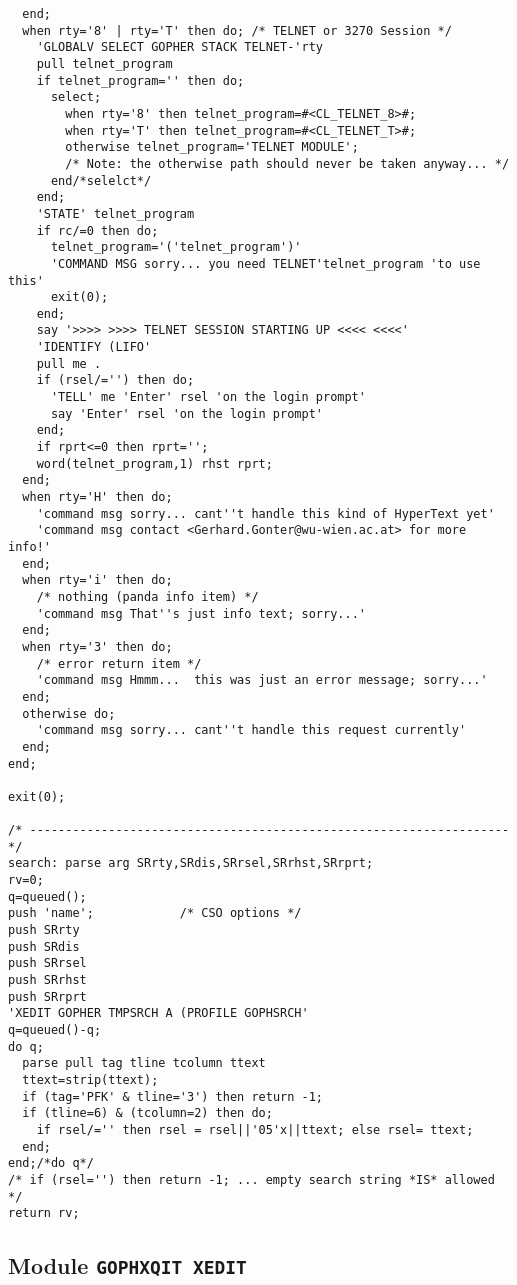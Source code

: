 \begin{verbatim}
  end;
  when rty='8' | rty='T' then do; /* TELNET or 3270 Session */
    'GLOBALV SELECT GOPHER STACK TELNET-'rty
    pull telnet_program
    if telnet_program='' then do;
      select;
        when rty='8' then telnet_program=#<CL_TELNET_8>#;
        when rty='T' then telnet_program=#<CL_TELNET_T>#;
        otherwise telnet_program='TELNET MODULE';
        /* Note: the otherwise path should never be taken anyway... */
      end/*selelct*/
    end;
    'STATE' telnet_program
    if rc/=0 then do;
      telnet_program='('telnet_program')'
      'COMMAND MSG sorry... you need TELNET'telnet_program 'to use this'
      exit(0);
    end;
    say '>>>> >>>> TELNET SESSION STARTING UP <<<< <<<<'
    'IDENTIFY (LIFO'
    pull me .
    if (rsel/='') then do;
      'TELL' me 'Enter' rsel 'on the login prompt'
      say 'Enter' rsel 'on the login prompt'
    end;
    if rprt<=0 then rprt='';
    word(telnet_program,1) rhst rprt;
  end;
  when rty='H' then do;
    'command msg sorry... cant''t handle this kind of HyperText yet'
    'command msg contact <Gerhard.Gonter@wu-wien.ac.at> for more info!'
  end;
  when rty='i' then do;
    /* nothing (panda info item) */
    'command msg That''s just info text; sorry...'
  end;
  when rty='3' then do;
    /* error return item */
    'command msg Hmmm...  this was just an error message; sorry...'
  end;
  otherwise do;
    'command msg sorry... cant''t handle this request currently'
  end;
end;

exit(0);

/* ------------------------------------------------------------------- */
search: parse arg SRrty,SRdis,SRrsel,SRrhst,SRrprt;
rv=0;
q=queued();
push 'name';            /* CSO options */
push SRrty
push SRdis
push SRrsel
push SRrhst
push SRrprt
'XEDIT GOPHER TMPSRCH A (PROFILE GOPHSRCH'
q=queued()-q;
do q;
  parse pull tag tline tcolumn ttext
  ttext=strip(ttext);
  if (tag='PFK' & tline='3') then return -1;
  if (tline=6) & (tcolumn=2) then do;
    if rsel/='' then rsel = rsel||'05'x||ttext; else rsel= ttext;
  end;
end;/*do q*/
/* if (rsel='') then return -1; ... empty search string *IS* allowed */
return rv;
\end{verbatim}

\subsection{Module {\tt GOPHXQIT XEDIT}}

\def\LPtopD{Module {\tt GOPHXQIT XEDIT}}

\def\LPtopF{~}

